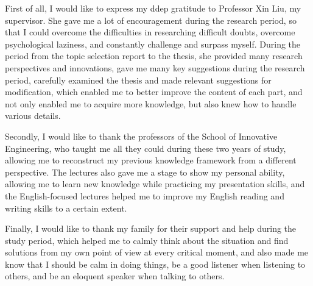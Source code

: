 First of all, I would like to express my ddep gratitude to Professor Xin Liu, my supervisor. She gave me a lot of encouragement during the research period, so that I could overcome the difficulties in researching difficult doubts, overcome psychological laziness, and constantly challenge and surpass myself. During the period from the topic selection report to the thesis, she provided many research perspectives and innovations, gave me many key suggestions during the research period, carefully examined the thesis and made relevant suggestions for modification, which enabled me to better improve the content of each part, and not only enabled me to acquire more knowledge, but also knew how to handle various details.

Secondly, I would like to thank the professors of the School of Innovative Engineering, who taught me all they could during these two years of study, allowing me to reconstruct my previous knowledge framework from a different perspective. The lectures also gave me a stage to show my personal ability, allowing me to learn new knowledge while practicing my presentation skills, and the English-focused lectures helped me to improve my English reading and writing skills to a certain extent.

Finally, I would like to thank my family for their support and help during the study period, which helped me to calmly think about the situation and find solutions from my own point of view at every critical moment, and also made me know that I should be calm in doing things, be a good listener when listening to others, and be an eloquent speaker when talking to others.






